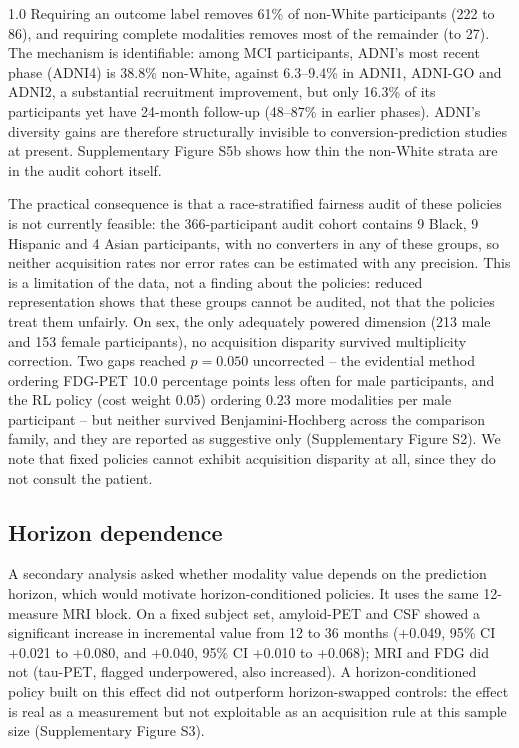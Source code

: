 \documentclass[12pt,twoside]{article}
\begin{document}
\begin{spacing}{1.0}
Requiring an outcome label removes 61\% of non-White participants (222 to
86), and requiring complete modalities removes most of the remainder (to
27). The mechanism is identifiable: among MCI participants, ADNI's most
recent phase (ADNI4) is 38.8\% non-White, against 6.3--9.4\% in ADNI1, ADNI-GO
and ADNI2, a substantial recruitment improvement, but only 16.3\% of its
participants yet have 24-month follow-up (48--87\% in earlier phases). ADNI's diversity gains are
therefore structurally invisible to conversion-prediction studies at
present. Supplementary Figure S5b shows how thin the non-White strata are in the audit
cohort itself.



The practical consequence is that a race-stratified fairness audit of these
policies is not currently feasible: the 366-participant audit cohort
contains 9 Black, 9 Hispanic and 4 Asian participants, with no converters in
any of these groups, so neither acquisition rates nor error rates can be
estimated with any precision. This is a limitation of the data, not a
finding about the policies: reduced representation shows that these groups
cannot be audited, not that the policies treat them unfairly. On sex, the only
adequately powered dimension (213 male and 153 female participants), no
acquisition disparity survived multiplicity correction. Two gaps reached
$p=0.050$ uncorrected -- the evidential method ordering FDG-PET 10.0
percentage points less often for male participants, and the RL policy (cost
weight 0.05) ordering 0.23 more modalities per male participant -- but
neither survived Benjamini-Hochberg across the comparison family, and they are
reported as suggestive only (Supplementary Figure S2). We note that fixed policies cannot
exhibit acquisition disparity at all, since they do not consult the patient.



\subsection{Horizon dependence}
A secondary analysis asked whether modality value depends on the prediction horizon, which would motivate
horizon-conditioned policies. It uses the same 12-measure MRI block. On a fixed subject set, amyloid-PET and CSF
showed a significant increase in incremental value from 12 to 36 months (+0.049, 95\% CI +0.021 to +0.080, and
+0.040, 95\% CI +0.010 to +0.068); MRI and FDG did not (tau-PET, flagged underpowered, also increased). A
horizon-conditioned policy built on this effect did not outperform horizon-swapped controls: the effect is real
as a measurement but not exploitable as an acquisition rule at this sample size (Supplementary Figure S3).



\end{spacing}
\end{document}
